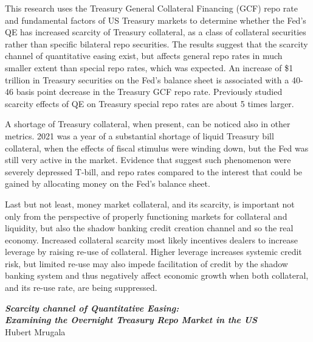 \documentclass[11pt,a4paper,english,oneside]{article}
\begin{document}
This research uses the Treasury General Collateral Financing (GCF) repo rate and fundamental factors of US Treasury markets to determine whether the Fed's QE has increased scarcity of Treasury collateral, as a class of collateral securities rather than specific bilateral repo securities. The results suggest that the scarcity channel of quantitative easing exist, but affects general repo rates in much smaller extent than special repo rates, which was expected. An increase of \$1 trillion in Treasury securities on the Fed's balance sheet is associated with a 40-46 basis point decrease in the Treasury GCF repo rate. Previously studied scarcity effects of QE on Treasury special repo rates are about 5 times larger.

A shortage of Treasury collateral, when present, can be noticed also in other metrics. 2021 was a year of a substantial shortage of liquid Treasury bill collateral, when the effects of fiscal stimulus were winding down, but the Fed was still very active in the market. Evidence that suggest such phenomenon were severely depressed T-bill, and repo rates compared to the interest that could be gained by allocating money on the Fed's balance sheet.

Last but not least, money market collateral, and its scarcity, is important not only from the perspective of properly functioning markets for collateral and liquidity, but also the shadow banking credit creation channel and so the real economy. Increased collateral scarcity most likely incentives dealers to increase leverage by raising re-use of collateral. Higher leverage increases systemic credit risk, but limited re-use may also impede facilitation of credit by the shadow banking system and thus negatively affect economic growth when both collateral, and its re-use rate, are being suppressed.

\newpage
\tableofcontents
\newpage
\listoffigures
\listoftables
\newpage
{}

\begin{center}
  {\Large \emph{\textbf{Scarcity channel of Quantitative Easing:\\
  Examining the Overnight Treasury Repo Market in the US}}}\\[4pt]
  Hubert Mrugala
\end{center}

\end{document}
